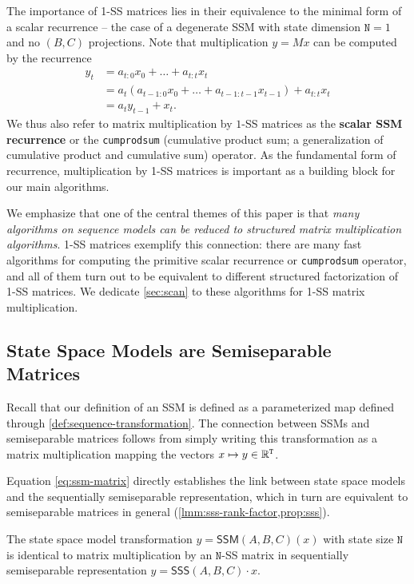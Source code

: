 The importance of 1-SS matrices lies in their equivalence to the minimal form of a scalar recurrence -- the case of a degenerate SSM with state dimension $\mathtt{N}=1$ and no $(B, C)$ projections.
Note that multiplication $y = Mx$ can be computed by the recurrence
\begin{equation}
  \label{eq:1ss-recurrence}
  \begin{aligned}
    y_t &= a_{t:0}x_0 + \dots + a_{t:t}x_t \\
        &= a_t \left(a_{t-1:0}x_0 + \dots + a_{t-1:t-1}x_{t-1}\right) + a_{t:t}x_t \\
        &= a_t y_{t-1} + x_t
        .
  \end{aligned}
\end{equation}
We thus also refer to matrix multiplication by $1$-SS matrices as the \textbf{scalar SSM recurrence} or the \texttt{cumprodsum} (cumulative product sum; a generalization of cumulative product and cumulative sum) operator.
As the fundamental form of recurrence, multiplication by 1-SS matrices is important
as a building block for our main algorithms.

We emphasize that one of the central themes of this paper is that \emph{many algorithms on sequence models can be reduced to structured matrix multiplication algorithms}.
1-SS matrices exemplify this connection: there are many fast algorithms for computing the primitive scalar recurrence or \texttt{cumprodsum} operator,
and all of them turn out to be equivalent to different structured factorization of 1-SS matrices.
We dedicate \cref{sec:scan} to these algorithms for 1-SS matrix multiplication.

\subsection{State Space Models are Semiseparable Matrices}
Recall that our definition of an SSM is defined as a parameterized map
defined through \cref{def:sequence-transformation}.
The connection between SSMs and semiseparable matrices follows from simply writing this transformation as a matrix multiplication mapping the vectors $x \mapsto y \in \mathbb{R}^\mathtt{T}$.

Equation \eqref{eq:ssm-matrix} directly establishes the link between state space models and the sequentially semiseparable representation, which in turn are equivalent to semiseparable matrices in general (\cref{lmm:sss-rank-factor,prop:sss}).
\begin{theorem}
  \label{thm:ssm-sss}
  The state space model transformation $y = \mathsf{SSM}(A, B, C)(x)$ with state size $\mathtt{N}$ is identical to matrix multiplication by an $\mathtt{N}$-SS matrix in sequentially semiseparable representation $y = \mathsf{SSS}(A, B, C) \cdot x$.
\end{theorem}

